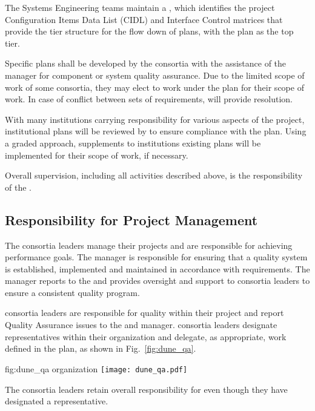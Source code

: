 The  Systems Engineering teams maintain a
 , which identifies the  project
Configuration Items Data List (CIDL) and Interface Control matrices
that provide the tier structure for the flow down of  plans,
with the   plan as the top tier.

Specific  plans shall be developed by the consortia with the
assistance of the   manager for
component or system quality assurance. Due to the limited scope of
work of some consortia, they may elect to work under the
  plan for their scope of work. In
case of conflict between sets of  requirements, 
 will provide resolution.

With many institutions carrying responsibility for various aspects of
the project, institutional  plans will be reviewed by
  to ensure compliance with the
  plan. Using a graded approach,
supplements to institutions existing plans will be implemented for
their  scope of work, if necessary.

Overall  supervision, including all activities described
above, is the responsibility of the  .

\subsection{Responsibility for Project Management}

The  consortia leaders manage their projects and are
responsible for achieving performance goals. The
  manager is responsible for
ensuring that a quality system is established, implemented and
maintained in accordance with requirements. The
  manager reports to the
  and provides oversight and support to
consortia leaders to ensure a consistent quality program.

 consortia leaders are responsible for quality within
their project and report Quality Assurance issues to the 
 and  
manager.  consortia leaders designate 
representatives within their organization and delegate, as appropriate, 
work defined in the   plan, as
shown in Fig.~\ref{fig:dune_qa}.
\begin{dunefigure}{fig:dune_qa}
  {  organization}
  \texttt{[image: dune\_qa.pdf]}
\end{dunefigure}
The  consortia leaders retain overall responsibility for
 even though they have designated a 
representative.

